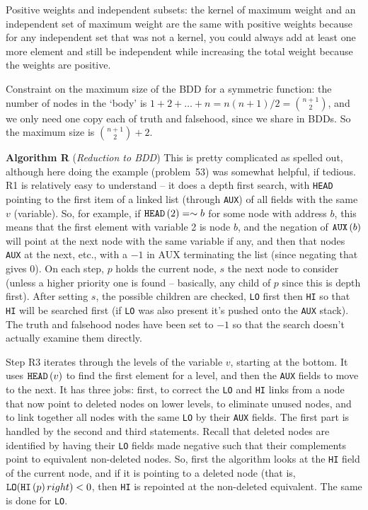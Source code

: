  Positive weights and independent subsets:
the kernel of maximum weight and an independent set of maximum weight
are the same with positive weights because for any independent set that
was not a kernel, you could always add at least one more element
and still be independent while increasing the total weight because the
weights are positive.


\noindent [p 213] Constraint on the maximum size of the BDD for
a symmetric function: the number of nodes in the `body' is
$1 + 2 + \ldots + n = n \left(n + 1\right) / 2 = {n + 1 \choose 2}$,
and we only need one copy each of truth and falsehood, since
we share in BDDs.  So the maximum size is ${n + 1 \choose 2} + 2$.

 {\bf Algorithm R} ({\it Reduction to BDD})\hfil\break
This is pretty complicated as spelled out, although here doing
the example (problem~53) was somewhat helpful, if tedious.
R1 is relatively easy to understand -- it does a depth first search,
with {\tt HEAD} pointing to the first item of a linked list (through {\tt AUX})
of all fields with the same $v$ (variable).  So, for example,
if ${\tt HEAD}\left(2\right) = \sim b$ for some node with address $b$,
this means that the first element with variable 2 is node $b$,
and the negation of ${\tt AUX}\left(b\right)$ will point at the next node with the same
variable if any, and then that nodes {\tt AUX} at the next, etc., with
a $-1$ in AUX terminating the list (since negating that gives 0).
On each step, $p$ holds the current node, $s$ the next node to consider
(unless a higher priority one is found -- basically, any child of $p$ since
this is depth first).  After setting $s$, the possible children are checked,
{\tt LO} first then {\tt HI} so that {\tt HI} will be searched first (if {\tt LO}
was also present it's pushed onto the {\tt AUX} stack).  The truth and
falsehood nodes have been set to $-1$ so that the search doesn't
actually examine them directly.

Step R3 iterates through the levels of the variable $v$, starting at
the bottom.  It uses ${\tt HEAD}\left(v\right)$ to find the first element for a 
level, and then the {\tt AUX} fields to move to the next.  It has three jobs:
first, to correct the {\tt LO} and {\tt HI} links from a node that now point
to deleted nodes on lower levels, to eliminate unused nodes,
and to link together all nodes with the same {\tt LO} by their
{\tt AUX} fields.
The first part is handled by the second and third statements.  Recall
that deleted nodes are identified by having their {\tt LO} fields
made negative such that their complements point to equivalent 
non-deleted nodes.  So, first the algorithm looks at the {\tt HI}
field of the current node, and if it is pointing to a deleted node
(that is, ${\tt LO}({\tt HI}\left(p\right)right) < 0$, then {\tt HI}
is repointed at the non-deleted equivalent.  The same is done
for {\tt LO}.  

